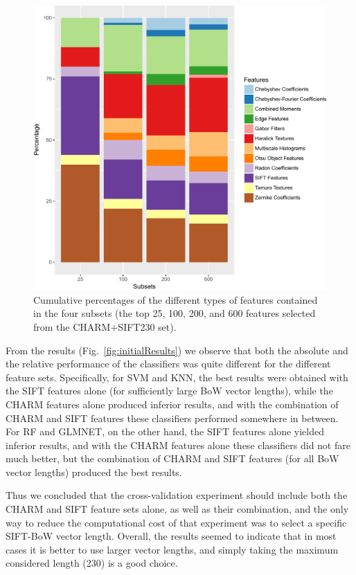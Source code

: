 \begin{figure}
	\centering
	\includegraphics[width=\columnwidth]{fig07}
	\caption{Cumulative percentages of the different types of features contained in the four subsets (the top 25, 100, 200, and 600 features selected from the CHARM+SIFT230 set).}
	\label{fig:subsetFS}
\end{figure}

From the results (Fig.~\ref{fig:initialResults}) we observe that both the absolute and the relative performance of the classifiers was quite different for the different feature sets. Specifically, for SVM and KNN, the best results were obtained with the SIFT features alone (for sufficiently large BoW vector lengths), while the CHARM features alone produced inferior results, and with the combination of CHARM and SIFT features these classifiers performed somewhere in between. For RF and GLMNET, on the other hand, the SIFT features alone yielded inferior results, and with the CHARM features alone these classifiers did not fare much better, but the combination of CHARM and SIFT features (for all BoW vector lengths) produced the best results.

Thus we concluded that the cross-validation experiment should include both the CHARM and SIFT feature sets alone, as well as their combination, and the only way to reduce the computational cost of that experiment was to select a specific SIFT-BoW vector length. Overall, the results seemed to indicate that in most cases it is better to use larger vector lengths, and simply taking the maximum considered length (230) is a good choice.

